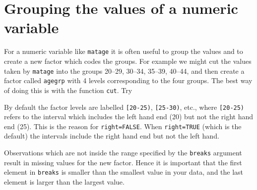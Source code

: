 \documentclass[
]{book}
\newenvironment{Shaded}{\begin{snugshade}}{\end{snugshade}}
\newcommand{\AttributeTok}[1]{\textcolor[rgb]{0.13,0.29,0.53}{#1}}
\newcommand{\ConstantTok}[1]{\textcolor[rgb]{0.56,0.35,0.01}{#1}}
\newcommand{\DecValTok}[1]{\textcolor[rgb]{0.00,0.00,0.81}{#1}}
\newcommand{\FunctionTok}[1]{\textcolor[rgb]{0.13,0.29,0.53}{\textbf{#1}}}
\newcommand{\NormalTok}[1]{#1}
\newcommand{\OtherTok}[1]{\textcolor[rgb]{0.56,0.35,0.01}{#1}}
\newcommand{\SpecialCharTok}[1]{\textcolor[rgb]{0.81,0.36,0.00}{\textbf{#1}}}
\begin{document}
\begin{Shaded}
\end{Shaded}

\section{Grouping the values of a numeric variable}\label{grouping-the-values-of-a-numeric-variable}

For a numeric variable like \texttt{matage} it is often useful
to group the values and to create a new factor which codes the groups.
For example we might cut the values taken by \texttt{matage} into the
groups 20--29, 30--34, 35--39, 40--44, and then create a factor called
\texttt{agegrp} with 4 levels corresponding to the four groups. The best way of doing this is
with the function \texttt{cut}. Try

\begin{Shaded}
\end{Shaded}

By default the factor levels are labelled \texttt{{[}20-25)},
\texttt{{[}25-30)}, etc., where \texttt{{[}20-25)} refers to the interval
which includes the left hand end (20) but not the right hand end
(25). This is the reason for \texttt{right=FALSE}. When \texttt{right=TRUE}
(which is the default) the intervals include the right hand end but
not the left hand.

Observations which are not inside the range specified by the \texttt{breaks}
argument result in missing values for the new factor. Hence it
is important that the first element in \texttt{breaks} is smaller than the
smallest value in your data, and the last element is larger than the
largest value.
\end{document}
